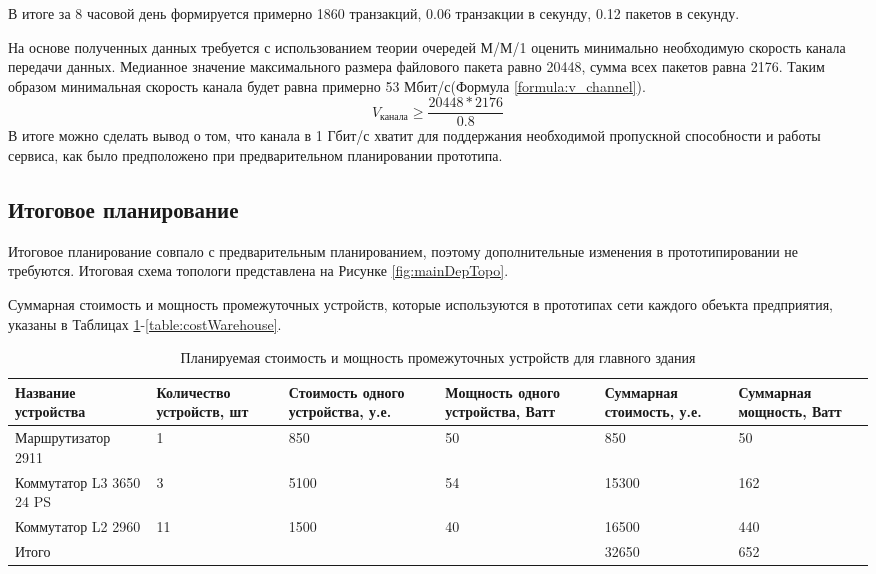 \documentclass[14pt, a4paper]{extarticle}
\numberwithin{equation}{section}
\begin{document}
В итоге за 8 часовой день формируется примерно 1860 транзакций,
0.06 транзакции в секунду, 0.12 пакетов в секунду.


На основе полученных данных требуется с использованием теории очередей М/М/1 \cite{calc} оценить минимально необходимую скорость канала передачи данных.
Медианное значение максимального размера файлового пакета равно 20448, сумма всех пакетов равна 2176.
Таким образом минимальная скорость канала будет равна примерно 53 Мбит/с(Формула \ref{formula:v_channel}).
\begin{equation}
        V_\text{канала} \ge \frac{20448 * 2176}{0.8}
        \label{formula:v_channel}
\end{equation}
В итоге можно сделать вывод о том, что канала в 1 Гбит/с хватит для поддержания необходимой пропускной способности и работы сервиса, как было предположено при предварительном планировании прототипа. 

\subsection{Итоговое планирование}
Итоговое планирование совпало с предварительным планированием, поэтому дополнительные изменения
в прототипировании не требуются. Итоговая схема топологи представлена на Рисунке \ref{fig:mainDepTopo}.

Суммарная стоимость и мощность промежуточных устройств, которые
используются в прототипах сети каждого обеъкта предприятия, указаны в Таблицах \ref{table:costMainDep}-\ref{table:costWarehouse}.
\begin{table}[H]
\centering
\small
\caption{Планируемая стоимость и мощность промежуточных устройств для главного здания}
\label{table:costMainDep}
\begin{tabular}{|m{2.8cm}|m{2.2cm}|m{2.2cm}|m{2.2cm}|m{2.2cm}|m{2.1cm}|}
\hline
\textbf{Название устройства} & \textbf{Количество устройств, шт} & \textbf{Стоимость одного устройства, у.е.} & \textbf{Мощность одного устройства, Ватт} & \textbf{Суммарная стоимость, у.е.} & \textbf{Суммарная мощность, Ватт}\\
\hline
Маршрутизатор 2911 & 1 & 850 & 50 & 850 & 50 \\ \hline
Коммутатор L3 3650 24 PS& 3 & 5100 & 54 & 15300 & 162 \\ \hline
Коммутатор L2 2960 & 11 & 1500 & 40 & 16500 & 440 \\ \hline
\multicolumn{4}{|l|}{Итого} & 32650 & 652 \\ \hline
\end{tabular}
\end{table} 
\end{document}
